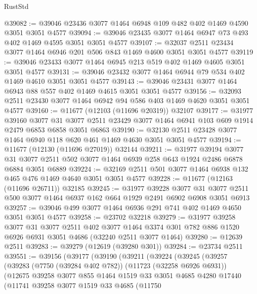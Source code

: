\begin{lexlean}{RustStd}
\begin{coremodule}
@39082 := @39046 @23436 @3077 @1464 @6948 @109 @482 @402 @1469 @4590 @3051 @3051 @4577
@39094 := @39046 @23435 @3077 @1464 @6947 @73 @493 @402 @1469 @4595 @3051 @3051 @4577
@39107 := @32037 @2511 @23434 @3077 @1464 @6946 @201 @506 @843 @1469 @4600 @3051 @3051 @4577
@39119 := @39046 @23433 @3077 @1464 @6945 @213 @519 @402 @1469 @4605 @3051 @3051 @4577
@39131 := @39046 @23432 @3077 @1464 @6944 @79 @534 @402 @1469 @4610 @3051 @3051 @4577
@39143 := @39046 @23431 @3077 @1464 @6943 @88 @557 @402 @1469 @4615 @3051 @3051 @4577
@39156 := @32093 @2511 @23430 @3077 @1464 @6942 @94 @586 @403 @1469 @4620 @3051 @3051 @4577
@39160 := @11677 (@12103 (@11696 @20319)) @32107
@39177 := @31977
    @39160
    @3077
    @31
    @3077
    @2511
    @23429
    @3077
    @1464
    @6941
    @103
    @609
    @1914
    @2479
    @6853
    @6858
    @3051
    @6863
@39190 := @32130 @2511 @23428 @3077 @1464 @6940 @118 @620 @461 @1469 @4630 @3051 @3051 @4577
@39194 := @11677 (@12130 (@11696 @27019)) @32144
@39211 := @31977
    @39194
    @3077
    @31
    @3077
    @2511
    @502
    @3077
    @1464
    @6939
    @258
    @643
    @1924
    @2486
    @6878
    @6884
    @3051
    @6889
@39224 := @32169 @2511 @501 @3077 @1464 @6938 @132 @465 @476 @1469 @4640 @3051 @3051 @4577
@39228 := @11677 (@12163 (@11696 @26711)) @32185
@39245 := @31977
    @39228
    @3077
    @31
    @3077
    @2511
    @500
    @3077
    @1464
    @6937
    @162
    @664
    @1929
    @2491
    @6902
    @6908
    @3051
    @6913
@39257 := @39046 @499 @3077 @1464 @6936 @291 @741 @402 @1469 @4650 @3051 @3051 @4577
@39258 := @23702 @32218
@39279 := @31977
    @39258
    @3077
    @31
    @3077
    @2511
    @402
    @3077
    @1464
    @3374
    @301
    @782
    @886
    @1520
    @6926
    @6931
    @3051
    @4686
    (@32240 @2511 @3077 @1464)
@39280 := @12639 @2511
@39283 := @39279 (@12619 (@39280 @301))
@39284 := @23734 @2511
@39551 := @39156
    (@39177
      (@39190
        (@39211
          (@39224
            (@39245
              (@39257
                (@39283
                  (@7750 (@39284 @402 @782))
                  (@11723 (@32258 @6926 @6931))
                  (@12675
                    @39258
                    @3077
                    @855
                    @1464
                    @1519
                    @33
                    @3051
                    @4685
                    @4280
                    @17440
                    (@11741
                      @39258
                      @3077
                      @1519
                      @33
                      @4685
                      (@11750

\end{coremodule}
\end{lexlean}
